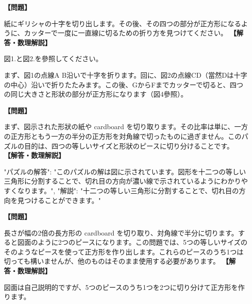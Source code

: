 \documentclass[10pt,a4paper,oneside,openany]{ltjsbook}
\begin{document}
\begin{tcolorbox}[colback=softblue,colframe=primaryblue,title=\textbf{第 145 問：折りたたんだ十字 （原題: THE FOLDED CROSS.）},arc=2mm,boxrule=1pt,breakable]
\textbf{【問題】}\par\vspace{0.3em}
紙にギリシャの十字を切り出します。その後、その四つの部分が正方形になるように、カッターで一度に一直線に切るための折り方を見つけてください。
\tcblower
\textbf{【解答・数理解説】}\par\vspace{0.3em}
図1.と図2.を參照してください。

まず、図1の点線A B沿いで十字を折ります。回に、図2の点線CD（當然Dは十字の中心）沿いで折りたたみます。この後、GからFまでカッターで切ると、四つの同じ大きさと形狀の部分が正方形になります（図4參照）。
\end{tcolorbox}

\begin{tcolorbox}[colback=softblue,colframe=primaryblue,title=\textbf{第 146 問：AN EASY DISSECTION PUZZLE.},arc=2mm,boxrule=1pt,breakable]
\textbf{【問題】}\par\vspace{0.3em}
まず、図示された形狀の紙や cardboard を切り取ります。その比率は単に、一方の正方形ともう一方の半分の正方形を対角線で切ったものに過ぎません。このパズルの目的は、四つの等しいサイズと形狀のピースに切り分けることです。
\tcblower
\textbf{【解答・数理解説】}\par\vspace{0.3em}
{
  "パズルの解答": "このパズルの解は図に示されています。図形を十二つの等しい三角形に分割することで、切れ目の方向が濃い線で示されているようにわかりやすくなります。",
  "解説": "十二つの等しい三角形に分割することで、切れ目の方向を見つけることができます。"
}
\end{tcolorbox}

\begin{tcolorbox}[colback=softblue,colframe=primaryblue,title=\textbf{第 147 問：簡単な正方形パズル （原題: AN EASY SQUARE PUZZLE.）},arc=2mm,boxrule=1pt,breakable]
\textbf{【問題】}\par\vspace{0.3em}
長さが幅の2倍の長方形の cardboard を切り取り、対角線で半分に切ります。すると図面のように2つのピースになります。この問題では、5つの等しいサイズのそのようなピースを使って正方形を作り出します。これらのピースのうち1つは切っても構いませんが、他のものはそのまま使用する必要があります。
\tcblower
\textbf{【解答・数理解説】}\par\vspace{0.3em}
図面は自己説明的ですが、5つのピースのうち1つを2つに切り分けて正方形を作ります。
\end{tcolorbox}
\end{document}
